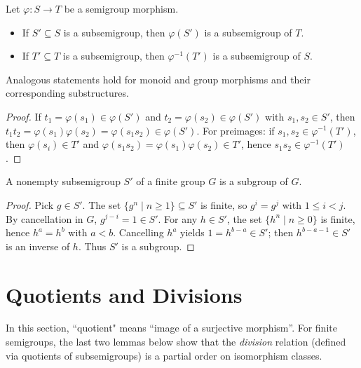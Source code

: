 \begin{lemma}
\label{lem:morphism-preserves-substructures}
Let \(\varphi:S\to T\) be a semigroup morphism.
\begin{itemize}
  \item If \(S'\subseteq S\) is a subsemigroup, then \(\varphi(S')\) is a subsemigroup of \(T\).
  \item If \(T'\subseteq T\) is a subsemigroup, then \(\varphi^{-1}(T')\) is a subsemigroup of \(S\).
\end{itemize}
Analogous statements hold for monoid and group morphisms and their corresponding substructures.
\end{lemma}
\begin{proof}
If \(t_1=\varphi(s_1)\in \varphi(S')\) and \(t_2=\varphi(s_2)\in \varphi(S')\) with \(s_1,s_2\in S'\), then \(t_1t_2=\varphi(s_1)\varphi(s_2)=\varphi(s_1s_2)\in\varphi(S')\). For preimages: if \(s_1,s_2\in \varphi^{-1}(T')\), then \(\varphi(s_i)\in T'\) and \(\varphi(s_1s_2)=\varphi(s_1)\varphi(s_2)\in T'\), hence \(s_1s_2\in \varphi^{-1}(T')\).
\end{proof}

\begin{lemma}
\label{lem:finite-group-subsemigroup-is-subgroup}
A nonempty subsemigroup \(S'\) of a finite group \(G\) is a subgroup of \(G\).
\end{lemma}
\begin{proof}
Pick \(g\in S'\). The set \(\{g^n\mid n\ge 1\}\subseteq S'\) is finite, so \(g^i=g^j\) with \(1\le i<j\). By cancellation in \(G\), \(g^{j-i}=1\in S'\). For any \(h\in S'\), the set \(\{h^n\mid n\ge 0\}\) is finite, hence \(h^a=h^b\) with \(a<b\). Cancelling \(h^a\) yields \(1=h^{b-a}\in S'\); then \(h^{b-a-1}\in S'\) is an inverse of \(h\). Thus \(S'\) is a subgroup.
\end{proof}


\section {Quotients and Divisions}

\noindent
In this section, “quotient" means “image of a surjective morphism”. For finite semigroups, the last two lemmas below show that the \emph{division} relation (defined via quotients of subsemigroups) is a partial order on isomorphism classes.

